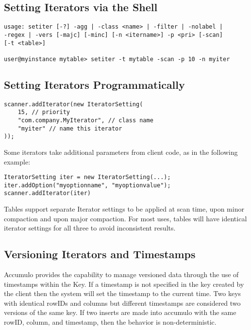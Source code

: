 \subsection{Setting Iterators via the Shell}

\small
\begin{verbatim}
usage: setiter [-?] -agg | -class <name> | -filter | -nolabel | 
-regex | -vers [-majc] [-minc] [-n <itername>] -p <pri> [-scan] 
[-t <table>]

user@myinstance mytable> setiter -t mytable -scan -p 10 -n myiter
\end{verbatim}
\normalsize

\subsection{Setting Iterators Programmatically}

\small
\begin{verbatim}
scanner.addIterator(new IteratorSetting(
    15, // priority
    "com.company.MyIterator", // class name
    "myiter" // name this iterator
));
\end{verbatim}
\normalsize

Some iterators take additional parameters from client code, as in the following
example:

\small
\begin{verbatim}
IteratorSetting iter = new IteratorSetting(...);
iter.addOption("myoptionname", "myoptionvalue");
scanner.addIterator(iter)
\end{verbatim}
\normalsize

Tables support separate Iterator settings to be applied at scan time, upon minor
compaction and upon major compaction. For most uses, tables will have identical
iterator settings for all three to avoid inconsistent results.

\subsection{Versioning Iterators and Timestamps}

Accumulo provides the capability to manage versioned data through the use of
timestamps within the Key. If a timestamp is not specified in the key created by the
client then the system will set the timestamp to the current time. Two keys with
identical rowIDs and columns but different timestamps are considered two versions
of the same key. If two inserts are made into accumulo with the same rowID,
column, and timestamp, then the behavior is non-deterministic.

